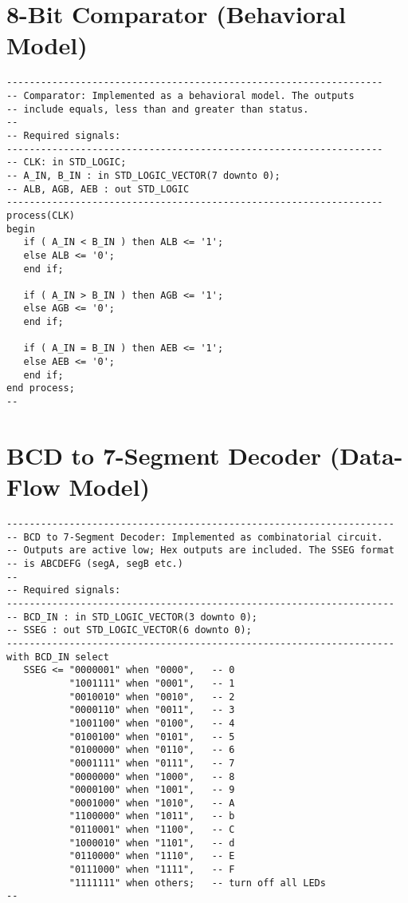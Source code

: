 \section{8-Bit Comparator (Behavioral Model)}
\noindent
\begin{minipage}{1\linewidth}
\begin{lstlisting}
------------------------------------------------------------------
-- Comparator: Implemented as a behavioral model. The outputs 
-- include equals, less than and greater than status.  
-- 
-- Required signals: 
------------------------------------------------------------------
-- CLK: in STD_LOGIC;
-- A_IN, B_IN : in STD_LOGIC_VECTOR(7 downto 0);
-- ALB, AGB, AEB : out STD_LOGIC
------------------------------------------------------------------
process(CLK)
begin
   if ( A_IN < B_IN ) then ALB <= '1';
   else ALB <= '0';
   end if;
    
   if ( A_IN > B_IN ) then AGB <= '1';
   else AGB <= '0';
   end if;
    
   if ( A_IN = B_IN ) then AEB <= '1';
   else AEB <= '0';
   end if;    
end process;
--
\end{lstlisting}
\end{minipage}

\section{BCD to 7-Segment Decoder (Data-Flow Model)}
\noindent
\begin{minipage}{1\linewidth}
\begin{lstlisting}
--------------------------------------------------------------------
-- BCD to 7-Segment Decoder: Implemented as combinatorial circuit.  
-- Outputs are active low; Hex outputs are included. The SSEG format
-- is ABCDEFG (segA, segB etc.)
--
-- Required signals: 
--------------------------------------------------------------------
-- BCD_IN : in STD_LOGIC_VECTOR(3 downto 0);
-- SSEG : out STD_LOGIC_VECTOR(6 downto 0); 
--------------------------------------------------------------------
with BCD_IN select
   SSEG <= "0000001" when "0000",   -- 0
           "1001111" when "0001",   -- 1
           "0010010" when "0010",   -- 2
           "0000110" when "0011",   -- 3
           "1001100" when "0100",   -- 4
           "0100100" when "0101",   -- 5
           "0100000" when "0110",   -- 6
           "0001111" when "0111",   -- 7
           "0000000" when "1000",   -- 8
           "0000100" when "1001",   -- 9
           "0001000" when "1010",   -- A
           "1100000" when "1011",   -- b
           "0110001" when "1100",   -- C
           "1000010" when "1101",   -- d
           "0110000" when "1110",   -- E
           "0111000" when "1111",   -- F
           "1111111" when others;   -- turn off all LEDs
--
\end{lstlisting}
\end{minipage}

